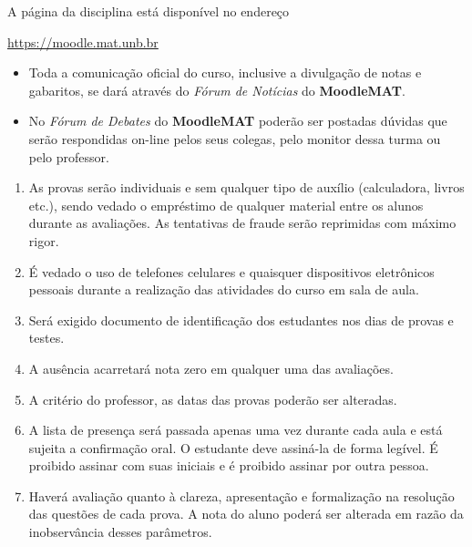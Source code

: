 \documentclass[12pt]{exam}
\begin{document}
\vspace{0.5cm}
 A página da disciplina está disponível no endereço
\begin{center}
    \href{https://moodle.mat.unb.br/course/view.php?id=65}{https://moodle.mat.unb.br}
\end{center}

\begin{itemize}
    \item Toda a comunicação oficial do curso, inclusive a divulgação de
          notas e gabaritos, se dará através do {\em Fórum de Notícias} do
          \textbf{MoodleMAT}.
    \item No {\em Fórum de Debates} do \textbf{MoodleMAT} poderão ser
          postadas dúvidas que serão respondidas on-line pelos seus
          colegas, pelo monitor dessa turma ou pelo professor.
\end{itemize}


\begin{enumerate}[label={\arabic*})]
    \item As provas serão individuais e sem qualquer tipo de auxílio (calculadora, livros etc.), sendo vedado o empréstimo de qualquer material entre os alunos durante as avaliações. As tentativas de fraude serão reprimidas com máximo rigor.

    \item É vedado o uso de telefones celulares e quaisquer dispositivos eletrônicos pessoais durante a realização das atividades do curso em sala de aula.

    \item Será exigido documento de identificação dos estudantes nos dias de provas e testes.

    \item A ausência acarretará nota zero em qualquer uma das avaliações.

    \item A critério do professor, as datas das provas poderão ser alteradas.

    \item A lista de presença será passada apenas uma vez durante cada aula e está sujeita a confirmação oral. O estudante deve assiná-la de forma legível. É proibido assinar com suas iniciais e é proibido assinar por outra pessoa.

    \item Haverá avaliação quanto à clareza, apresentação e formalização na  resolução das questões de cada prova. A nota do aluno poderá ser alterada em razão da inobservância desses parâmetros.

\end{enumerate}
\end{document}
